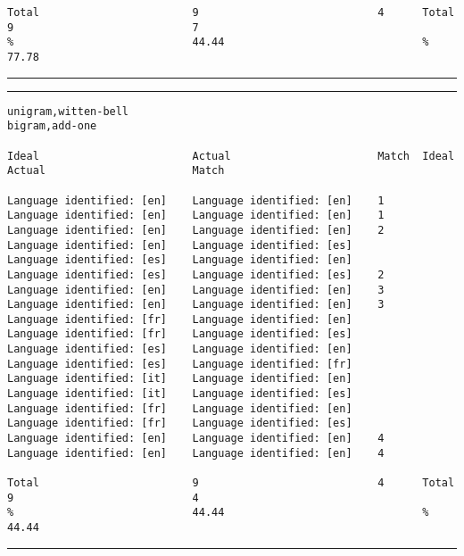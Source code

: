 \begin{verbatim}
Total                        9                            4      Total                        9                            7
%                            44.44                               %                            77.78
\end{verbatim}
\vskip4pt\hrule

\tiny
\hrule\vskip4pt
\begin{verbatim}
unigram,witten-bell                                              bigram,add-one

Ideal                        Actual                       Match  Ideal                        Actual                       Match

Language identified: [en]    Language identified: [en]    1      Language identified: [en]    Language identified: [en]    1
Language identified: [en]    Language identified: [en]    2      Language identified: [en]    Language identified: [es]
Language identified: [es]    Language identified: [en]           Language identified: [es]    Language identified: [es]    2
Language identified: [en]    Language identified: [en]    3      Language identified: [en]    Language identified: [en]    3
Language identified: [fr]    Language identified: [en]           Language identified: [fr]    Language identified: [es]
Language identified: [es]    Language identified: [en]           Language identified: [es]    Language identified: [fr]
Language identified: [it]    Language identified: [en]           Language identified: [it]    Language identified: [es]
Language identified: [fr]    Language identified: [en]           Language identified: [fr]    Language identified: [es]
Language identified: [en]    Language identified: [en]    4      Language identified: [en]    Language identified: [en]    4

Total                        9                            4      Total                        9                            4
%                            44.44                               %                            44.44
\end{verbatim}
\vskip4pt\hrule

\clearpage

